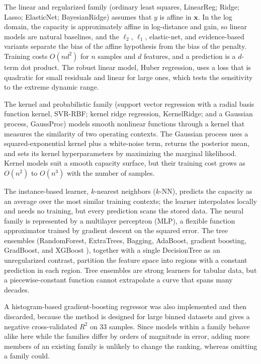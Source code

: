 \documentclass{ieee-ojvt}
\begin{document}
The linear and regularized family (ordinary least squares, LinearReg; Ridge; Lasso;
ElasticNet; BayesianRidge) assumes that $y$ is affine in $\mathbf{x}$. In the log domain,
the capacity is approximately affine in log-distance and gain, so linear models are
natural baselines, and the $\ell_2$, $\ell_1$, elastic-net, and evidence-based variants
separate the bias of the affine hypothesis from the bias of the penalty. Training costs
$O(nd^2)$ for $n$ samples and $d$ features, and a prediction is a $d$-term dot product.
The robust linear model, Huber regression, uses a loss that is quadratic for small
residuals and linear for large ones, which tests the sensitivity to the extreme dynamic
range.

The kernel and probabilistic family (support vector regression with a radial basis
function kernel, SVR-RBF; kernel ridge regression, KernelRidge; and a Gaussian process,
GaussProc) models smooth nonlinear functions through a kernel that measures the
similarity of two operating contexts. The Gaussian process \cite{rasmussen2006gp} uses a
squared-exponential kernel plus a white-noise term, returns the posterior mean, and sets
its kernel hyperparameters by maximizing the marginal likelihood. Kernel models suit a
smooth capacity surface, but their training cost grows as $O(n^2)$ to $O(n^3)$ with the
number of samples.

The instance-based learner, $k$-nearest neighbors ($k$-NN), predicts the capacity as an
average over the most similar training contexts; the learner interpolates locally and
needs no training, but every prediction scans the stored data. The neural family is
represented by a multilayer perceptron (MLP), a flexible function approximator trained by
gradient descent on the squared error. The tree ensembles (RandomForest, ExtraTrees,
Bagging, AdaBoost, gradient boosting, GradBoost, and XGBoost \cite{chen2016xgboost}),
together with a single DecisionTree as an unregularized contrast, partition the feature
space into regions with a constant prediction in each region. Tree ensembles are strong
learners for tabular data, but a piecewise-constant function cannot extrapolate a curve
that spans many decades.

A histogram-based gradient-boosting regressor was also implemented and then discarded,
because the method is designed for large binned datasets and gives a negative
cross-validated $R^2$ on $33$ samples. Since models within a family behave alike here
while the families differ by orders of magnitude in error, adding more members of an
existing family is unlikely to change the ranking, whereas omitting a family could.
\end{document}
